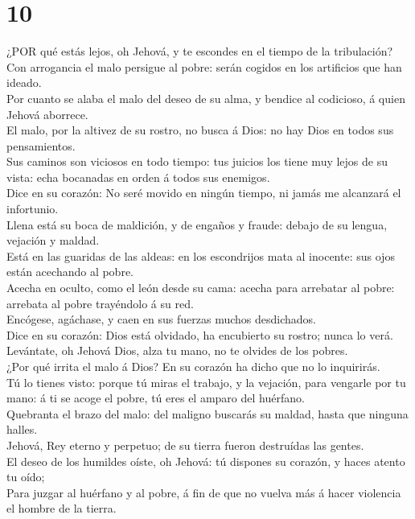 \hypertarget{section-9}{%
\section{10}\label{section-9}}

 ¿POR qué estás lejos, oh Jehová, y te escondes en el tiempo
de la tribulación?\\
 Con arrogancia el malo persigue al pobre: serán cogidos en
los artificios que han ideado.\\
 Por cuanto se alaba el malo del deseo de su alma, y bendice
al codicioso, á quien Jehová aborrece.\\
 El malo, por la altivez de su rostro, no busca á Dios: no
hay Dios en todos sus pensamientos.\\
 Sus caminos son viciosos en todo tiempo: tus juicios los
tiene muy lejos de su vista: echa bocanadas en orden á todos sus
enemigos.\\
 Dice en su corazón: No seré movido en ningún tiempo, ni
jamás me alcanzará el infortunio.\\
 Llena está su boca de maldición, y de engaños y fraude:
debajo de su lengua, vejación y maldad.\\
 Está en las guaridas de las aldeas: en los escondrijos mata
al inocente: sus ojos están acechando al pobre.\\
 Acecha en oculto, como el león desde su cama: acecha para
arrebatar al pobre: arrebata al pobre trayéndolo á su red.\\
 Encógese, agáchase, y caen en sus fuerzas muchos
desdichados.\\
 Dice en su corazón: Dios está olvidado, ha encubierto su
rostro; nunca lo verá.\\
 Levántate, oh Jehová Dios, alza tu mano, no te olvides de
los pobres.\\
 ¿Por qué irrita el malo á Dios? En su corazón ha dicho que
no lo inquirirás.\\
 Tú lo tienes visto: porque tú miras el trabajo, y la
vejación, para vengarle por tu mano: á ti se acoge el pobre, tú eres el
amparo del huérfano.\\
 Quebranta el brazo del malo: del maligno buscarás su
maldad, hasta que ninguna halles.\\
 Jehová, Rey eterno y perpetuo; de su tierra fueron
destruídas las gentes.\\
 El deseo de los humildes oíste, oh Jehová: tú dispones su
corazón, y haces atento tu oído;\\
 Para juzgar al huérfano y al pobre, á fin de que no vuelva
más á hacer violencia el hombre de la tierra.

